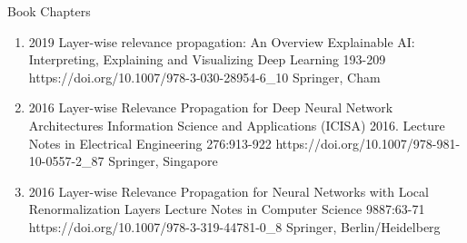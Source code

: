 \documentclass[10pt,a4paper]{article} %
\begin{document}
\headedsection %
{Book Chapters}{}
{
    \begin{enumerate}
        \item[] 
                            {2019}
                            {Layer-wise relevance propagation: An Overview}
                            {Explainable AI: Interpreting, Explaining and Visualizing Deep Learning}
                            {193-209}
                            {https://doi.org/10.1007/978-3-030-28954-6_10}
                            {Springer, Cham}

        \item[] 
                            {2016}
                            {Layer-wise Relevance Propagation for Deep Neural Network Architectures}
                            {Information Science and Applications (ICISA) 2016. Lecture Notes in Electrical Engineering}
                            {276:913-922}
                            {https://doi.org/10.1007/978-981-10-0557-2_87}
                            {Springer, Singapore}

        \item[] 
                            {2016}
                            {Layer-wise Relevance Propagation for Neural Networks with Local Renormalization Layers}
                            {Lecture Notes in Computer Science}
                            {9887:63-71}
                            {https://doi.org/10.1007/978-3-319-44781-0_8}
                            {Springer, Berlin/Heidelberg}
    \end{enumerate}

}
\end{document}
